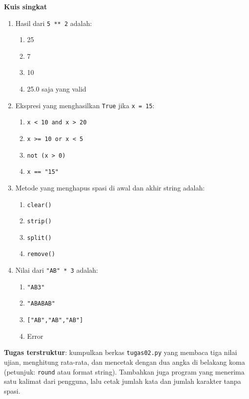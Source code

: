\documentclass[../main.tex]{subfiles}
\begin{document}
\begin{asesmen}
\textbf{Kuis singkat}

\begin{enumerate}
  \item Hasil dari \texttt{5 ** 2} adalah:
  \begin{enumerate}
    \item 25
    \item 7
    \item 10
    \item 25.0 saja yang valid
  \end{enumerate}
  \item Ekspresi yang menghasilkan \texttt{True} jika \texttt{x = 15}:
  \begin{enumerate}
    \item \texttt{x < 10 and x > 20}
    \item \texttt{x >= 10 or x < 5}
    \item \texttt{not (x > 0)}
    \item \texttt{x == "15"}
  \end{enumerate}
  \item Metode yang menghapus spasi di awal dan akhir string adalah:
  \begin{enumerate}
    \item \texttt{clear()}
    \item \texttt{strip()}
    \item \texttt{split()}
    \item \texttt{remove()}
  \end{enumerate}
  \item Nilai dari \texttt{"AB" * 3} adalah:
  \begin{enumerate}
    \item \texttt{"AB3"}
    \item \texttt{"ABABAB"}
    \item \texttt{["AB","AB","AB"]}
    \item Error
  \end{enumerate}
\end{enumerate}

\textbf{Tugas terstruktur}: kumpulkan berkas \texttt{tugas02.py} yang membaca tiga nilai ujian, menghitung rata-rata, dan mencetak dengan dua angka di belakang koma (petunjuk: \texttt{round} atau format string). Tambahkan juga program yang menerima satu kalimat dari pengguna, lalu cetak jumlah kata dan jumlah karakter tanpa spasi.
\end{asesmen}
\end{document}
